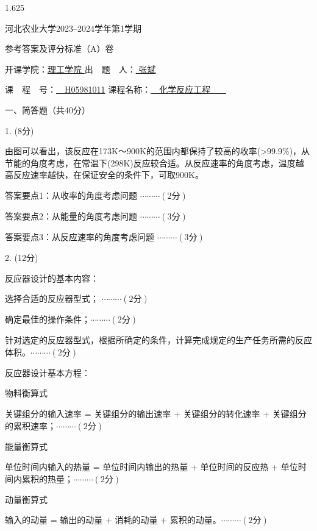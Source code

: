 \documentclass[12pt, b5paper]{article}
\begin{document}
\begin{spacing}{1.625}

\centerline{{\Large 河北农业大学2023--2024学年第1学期}}

\centerline{\Large 参考答案及评分标准（A）卷}

\centerline{开课学院：\underline{\quad 理工学院 \quad} \quad 出\ \ 题\ \ 人：\underline{ \qquad \qquad 张斌 \qquad \qquad}}

\centerline{课\ \ 程\ \ 号：\underline{\ \ H05981011\quad} \quad 课程名称：\underline{\quad \quad \ \ 化学反应工程 \quad \ \ \ }}

\bigskip

一、简答题（共40分）

1. (8分) 

由图可以看出，该反应在173K～900K的范围内都保持了较高的收率(>99.9\%)，从节能的角度考虑，在常温下(298K)反应较合适。从反应速率的角度考虑，温度越高反应速率越快，在保证安全的条件下，可取900K。

答案要点1：从收率的角度考虑问题 \hfill $\cdots \cdots \cdots (2\text{分})$

答案要点2：从能量的角度考虑问题 \hfill $\cdots \cdots \cdots (3\text{分})$

答案要点3：从反应速率的角度考虑问题 \hfill $\cdots \cdots \cdots (3\text{分})$

\bigskip

2. (12分) 

反应器设计的基本内容：

 选择合适的反应器型式； \hfill $\cdots \cdots \cdots (2\text{分})$ 

 确定最佳的操作条件；\hfill $\cdots \cdots \cdots (2\text{分})$

 针对选定的反应器型式，根据所确定的条件，计算完成规定的生产任务所需的反应体积。\hfill $\cdots \cdots \cdots (2\text{分})$

反应器设计基本方程：

 物料衡算式

关键组分的输入速率 = 关键组分的输出速率 + 关键组分的转化速率 + 关键组分的累积速率；\hfill $\cdots \cdots \cdots (2\text{分})$

 能量衡算式

单位时间内输入的热量 = 单位时间内输出的热量 + 单位时间的反应热 + 单位时间内累积的热量；\hfill $\cdots \cdots \cdots (2\text{分})$

 动量衡算式

输入的动量 = 输出的动量 + 消耗的动量 + 累积的动量。\hfill $\cdots \cdots \cdots (2\text{分})$


\end{spacing}
\end{document}
